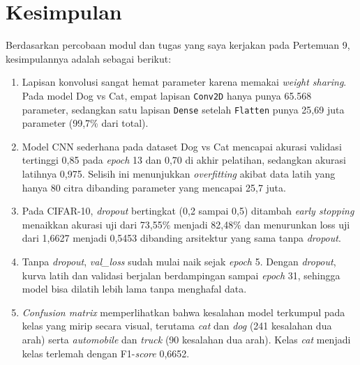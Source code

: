 \documentclass[a4paper,oneside,12pt]{report}
\begin{document}
\chapter{Kesimpulan}
Berdasarkan percobaan modul dan tugas yang saya kerjakan pada Pertemuan 9, kesimpulannya adalah sebagai berikut:
\begin{enumerate}[noitemsep, topsep=2pt, parsep=1pt]
	\item Lapisan konvolusi sangat hemat parameter karena memakai \textit{weight sharing}. Pada model Dog vs Cat, empat lapisan \texttt{Conv2D} hanya punya 65.568 parameter, sedangkan satu lapisan \texttt{Dense} setelah \texttt{Flatten} punya 25,69 juta parameter (99,7\% dari total).
	\item Model CNN sederhana pada dataset Dog vs Cat mencapai akurasi validasi tertinggi 0,85 pada \textit{epoch} 13 dan 0,70 di akhir pelatihan, sedangkan akurasi latihnya 0,975. Selisih ini menunjukkan \textit{overfitting} akibat data latih yang hanya 80 citra dibanding parameter yang mencapai 25,7 juta.
	\item Pada CIFAR-10, \textit{dropout} bertingkat (0,2 sampai 0,5) ditambah \textit{early stopping} menaikkan akurasi uji dari 73,55\% menjadi 82,48\% dan menurunkan loss uji dari 1,6627 menjadi 0,5453 dibanding arsitektur yang sama tanpa \textit{dropout}.
	\item Tanpa \textit{dropout}, \textit{val\_loss} sudah mulai naik sejak \textit{epoch} 5. Dengan \textit{dropout}, kurva latih dan validasi berjalan berdampingan sampai \textit{epoch} 31, sehingga model bisa dilatih lebih lama tanpa menghafal data.
	\item \textit{Confusion matrix} memperlihatkan bahwa kesalahan model terkumpul pada kelas yang mirip secara visual, terutama \textit{cat} dan \textit{dog} (241 kesalahan dua arah) serta \textit{automobile} dan \textit{truck} (90 kesalahan dua arah). Kelas \textit{cat} menjadi kelas terlemah dengan F1-\textit{score} 0,6652.
\end{enumerate}

\clearpage
\end{document}

